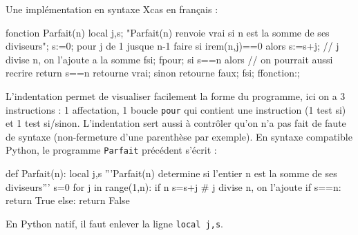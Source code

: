 \documentclass[12pt,a4paper]{book}
\begin{document}
\begin{giacjshere}
Une impl\'ementation en syntaxe Xcas en fran\c{c}ais :
\begin{giacprog}
fonction Parfait(n)
  local j,s;
  "Parfait(n) renvoie vrai si n est la somme de ses diviseurs";
  s:=0;
  pour j de 1 jusque n-1 faire
    si irem(n,j)==0 alors
      s:=s+j; // j divise n, on l'ajoute a la somme
    fsi;
  fpour;
  si s==n alors // on pourrait aussi recrire return s==n
    retourne vrai;
  sinon
    retourne faux;
  fsi;
ffonction:;  
\end{giacprog}
L'indentation permet de visualiser facilement la forme du programme, ici on a 
3 instructions : 1 affectation, 1 boucle {\tt pour} qui contient une instruction
(1 test si) et 1 test si/sinon.
L'indentation sert aussi \`a contr\^oler qu'on n'a pas fait
de faute de syntaxe (non-fermeture d'une parenth\`ese par exemple).
En syntaxe compatible Python, le programme {\tt Parfait} 
pr\'ec\'edent s'\'ecrit :
\begin{giacprog}
def Parfait(n):
  local j,s
  '''Parfait(n) determine si l'entier n est la somme de ses diviseurs'''
  s=0
  for j in range(1,n):
    if n%
      s=s+j # j divise n, on l'ajoute
  if s==n:
    return True
  else:
    return False 
\end{giacprog}
En Python natif, il faut enlever la ligne \verb|local j,s|.



\end{giacjshere}
\end{document}
